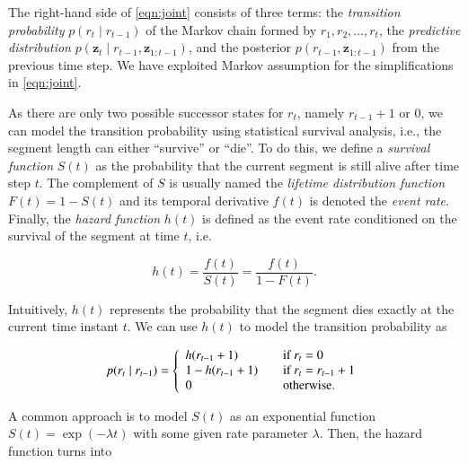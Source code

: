 The right-hand side of \eqref{eqn:joint} consists of three terms: the
\emph{transition probability} $p(r_t\mid r_{t-1})$ of the Markov chain formed by
$r_1,r_2,\dots,r_t$, the \emph{predictive distribution}
$p(\mathbf{z}_t\mid r_{t-1},\mathbf{z}_{1:t-1})$, and the posterior
$p(r_{t-1},\mathbf{z}_{1:t-1})$ from the previous time step. We have exploited
Markov assumption for the simplifications in \eqref{eqn:joint}.


As there are only two possible successor states for $r_t$, namely
\mbox{$r_{t-1}+1$} or $0$, we can model the transition probability using
statistical survival analysis, i.e., the segment length can
either ``survive'' or ``die''. To do this, we define a \emph{survival function}
$S(t)$ as the probability that the current segment is still alive after time
step $t$. The complement of $S$ is usually named the
\emph{lifetime distribution function} $F(t)= 1- S(t)$ and its temporal
derivative $f(t)$ is denoted the \emph{event rate}. Finally, the
\emph{hazard function} $h(t)$ is defined as the event rate conditioned on the
survival of the segment at time $t$, i.e.

\begin{equation}
\label{eqn:hazardfunc}
h(t) = \frac{f(t)}{S(t)} = \frac{f(t)}{1 - F(t)}.
\end{equation}

Intuitively, $h(t)$ represents the probability that the segment dies exactly at
the current time instant $t$. We can use $h(t)$ to model the transition
probability as

\begin{equation}
\label{eqn:transprob}
p(r_t\mid r_{t-1}) = \left\{
\begin{array}{l l}
h(r_{t-1}+1) & \quad \text{if $r_t=0$ }\\
1 - h(r_{t-1}+1) & \quad \text{if $r_t=r_{t-1}+1$}\\
0 & \quad \text{otherwise}.
\end{array} \right.
\end{equation}

A common approach is to model $S(t)$ as an exponential function
$S(t)=\exp(-\lambda t)$ with some given rate parameter $\lambda$. Then, the
hazard function turns into

